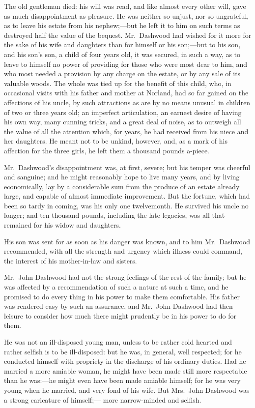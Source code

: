 \documentclass{article}
\begin{document}
The old gentleman died: his will was read, and
like almost every other will, gave as much disappointment
as pleasure.  He was neither so unjust, nor so ungrateful,
as to leave his estate from his nephew;---but he left it to him
on such terms as destroyed half the value of the bequest.
Mr.\ Dashwood had wished for it more for the sake of his
wife and daughters than for himself or his son;---but to
his son, and his son's son, a child of four years old,
it was secured, in such a way, as to leave to himself
no power of providing for those who were most dear
to him, and who most needed a provision by any charge
on the estate, or by any sale of its valuable woods.
The whole was tied up for the benefit of this child, who,
in occasional visits with his father and mother at Norland,
had so far gained on the affections of his uncle,
by such attractions as are by no means unusual in children
of two or three years old; an imperfect articulation,
an earnest desire of having his own way, many cunning tricks,
and a great deal of noise, as to outweigh all the value
of all the attention which, for years, he had received
from his niece and her daughters.  He meant not to
be unkind, however, and, as a mark of his affection
for the three girls, he left them a thousand pounds a-piece.

Mr.\ Dashwood's disappointment was, at first, severe;
but his temper was cheerful and sanguine; and he might
reasonably hope to live many years, and by living economically,
lay by a considerable sum from the produce of an estate
already large, and capable of almost immediate improvement.
But the fortune, which had been so tardy in coming, was his
only one twelvemonth.  He survived his uncle no longer;
and ten thousand pounds, including the late legacies,
was all that remained for his widow and daughters.

His son was sent for as soon as his danger was known,
and to him Mr.\ Dashwood recommended, with all the strength
and urgency which illness could command, the interest
of his mother-in-law and sisters.

Mr.\ John Dashwood had not the strong feelings of the
rest of the family; but he was affected by a recommendation
of such a nature at such a time, and he promised to do
every thing in his power to make them comfortable.
His father was rendered easy by such an assurance,
and Mr.\ John Dashwood had then leisure to consider how
much there might prudently be in his power to do for them.

He was not an ill-disposed young man, unless to
be rather cold hearted and rather selfish is to be
ill-disposed: but he was, in general, well respected;
for he conducted himself with propriety in the discharge
of his ordinary duties.  Had he married a more amiable woman,
he might have been made still more respectable than he
was:---he might even have been made amiable himself; for he
was very young when he married, and very fond of his wife.
But Mrs.\ John Dashwood was a strong caricature of himself;---%
more narrow-minded and selfish.
\end{document}
